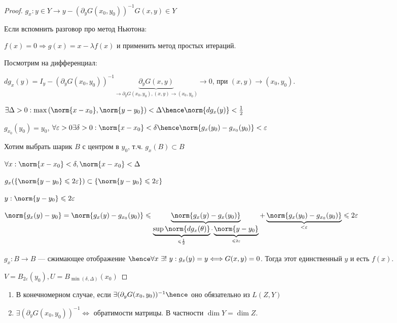 \begin{proof}
    $g_x : y \in Y \to y - (\partial_y G(x_0, y_0)) ^ {-1} G(x, y) \in Y$

    Если вспомнить разговор про метод Ньютона:

    $f(x) = 0 \Rightarrow g(x) = x - \lambda f(x)$ и применить метод простых итераций.

    Посмотрим на дифференциал:

    $dg_x(y) = I_y - (\partial_y G(x_0, y_0)) ^ {-1} \underbrace{\partial_y G(x, y)}_ {\to \partial_y G(x_0, y_0), (x, y) \to (x_0, y_0) } \to 0$, при $(x, y) \to (x_0, y_0)$.

    $\exists \Delta > 0 : \max{(\norm{x - x_0} , \norm{y - y_0})} < \Delta \hence \norm{dg_x(y)} < \frac{1}{2}$

    $g_{x_0}(y_0) = y_0$, $\forall \varepsilon > 0 \exists \delta > 0 : \norm{x - x_0} < \delta \hence \norm{g_x(y_0) - g_{x_0}(y_0)} < \varepsilon$

    Хотим выбрать шарик $B$ с центром в $y_0$, т.ч. $g_x(B) \subset B$

    $\forall x : \norm{x - x_0} < \delta, \norm{x - x_0} < \Delta$

    $ g_x(\{ \norm{y - y_0} \leqslant 2 \varepsilon \}) \subset \{ \norm{y - y_0} \leqslant 2 \varepsilon \}$

    $y : \norm{y - y_0} \leqslant 2 \varepsilon$

    $\norm{g_x(y) - y_0} = \norm{g_x(y) - g_{x_0}(y_0)} \leqslant \underbrace{\norm{g_x(y) - g_x(y_0)}}_{\underbrace{\sup \norm{dg_x(\theta)}}_{\leqslant \frac{1}{2}} \cdot \underbrace{\norm{y - y_0}}_{\leqslant 2 \varepsilon}} + \underbrace{\norm{g_x(y_0) - g_{x_0}(y_0)}}_{< \varepsilon} \leqslant 2 \varepsilon$

    $g_x : B \to B$ --- сжимающее отображение $\hence \forall x\,\, \exists! \,\, y : g_x(y) = y \Longleftrightarrow G(x, y) = 0$. Тогда этот единственный $y$ и есть $f(x)$.

    $V = B_{2\varepsilon}(y_0), U = B_{\min(\delta, \Delta)}(x_0)$
\end{proof}

\begin{remark}
\quad
    \begin{enumerate}
        \item В конечномерном случае, если $\exists (\partial_y G(x_0, y_0))^ {-1} \hence $ оно обязательно из $L(Z, Y)$
        \item $\exists (\partial_y G(x_0, y_0))^{-1} \Longleftrightarrow $ обратимости матрицы. В частности $\dim Y = \dim Z$.
    \end{enumerate}
\end{remark}
